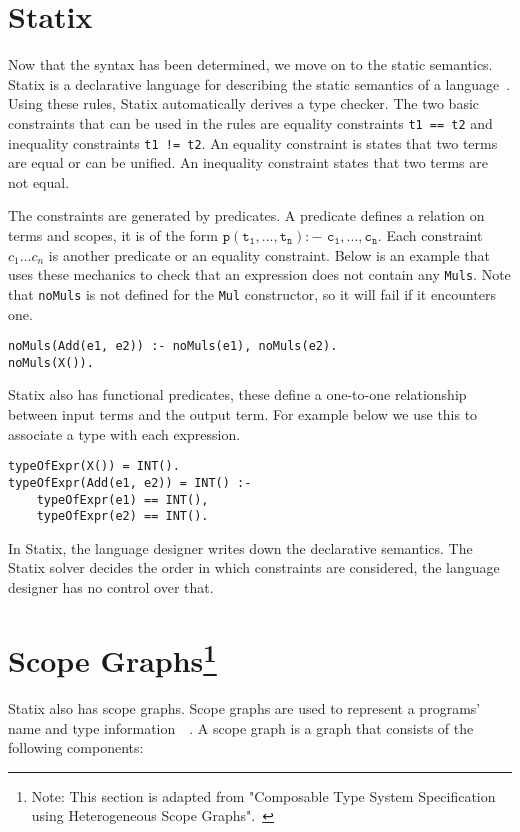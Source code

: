 \section{Statix}
Now that the syntax has been determined, we move on to the static semantics. Statix is a declarative language for describing the static semantics of a language~\cite{scopes_as_types}. Using these rules, Statix automatically derives a type checker.  The two basic constraints that can be used in the rules are equality constraints \verb|t1 == t2| and inequality constraints \verb|t1 != t2|. An equality constraint is states that two terms are equal or can be unified. An inequality constraint states that two terms are not equal. 

The constraints are generated by predicates. A predicate defines a relation on terms and scopes, it is of the form $\mathtt{p(t_1, ..., t_n) :-\,\,c_1, ..., c_n}$. Each constraint $c_1...c_n$ is another predicate or an equality constraint. Below is an example that uses these mechanics to check that an expression does not contain any \verb|Muls|. Note that \verb|noMuls| is not defined for the \verb|Mul| constructor, so it will fail if it encounters one.
\begin{lstlisting}
noMuls(Add(e1, e2)) :- noMuls(e1), noMuls(e2).
noMuls(X()).
\end{lstlisting}

Statix also has functional predicates, these define a one-to-one relationship between input terms and the output term. For example below we use this to associate a type with each expression.
\begin{lstlisting}
typeOfExpr(X()) = INT().
typeOfExpr(Add(e1, e2)) = INT() :-
	typeOfExpr(e1) == INT(),
	typeOfExpr(e2) == INT().
\end{lstlisting}

In Statix, the language designer writes down the declarative semantics. The Statix solver decides the order in which constraints are considered, the language designer has no control over that.

\section[Scope graphs]{\label{sec:statix}Scope Graphs\protect\footnote{Note: This section is adapted from "Composable Type System Specification using Heterogeneous Scope Graphs".~\cite[sect. 4.1.2]{Zwaan21}}}

Statix also has scope graphs. Scope graphs are used to represent a programs' name and type information~\cite{scopes_as_types}~\cite{nameres}. A scope graph is a graph that consists of the following components:

